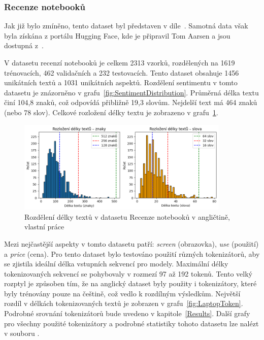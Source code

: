 \subsubsection{Recenze notebooků}
Jak již bylo zmíněno, tento dataset byl představen v díle~\cite{pontiki-etal-2014-semeval}. Samotná data však byla získána z portálu Hugging Face, kde je připravil Tom Aarsen a jsou dostupná z~\cite{TomLaptops}.

V datasetu recenzí notebooků je celkem 2313 vzorků, rozdělených na 1619 trénovacích, 462 validačních a 232 testovacích. Tento dataset obsahuje 1456 unikátních textů a 1031 unikátních aspektů. Rozdělení sentimentu v tomto datasetu je znázorněno v grafu~\ref{fig:SentimentDistribution}. Průměrná délka textu činí 104,8 znaků, což odpovídá přibližně 19,3 slovům. Nejdelší text má 464 znaků (nebo 78 slov). Celkové rozložení délky textu je zobrazeno v grafu~\ref{fig:LaptopLenDistribution}.

\begin{figure}[ht]
    \centering
    \includegraphics[width=0.9\textwidth]{images/Laptops-distribution}
    \caption[Rozdělení délky textů v datasetu Recenze notebooků v angličtině]%
    {Rozdělení délky textů v datasetu Recenze notebooků v angličtině, vlastní práce}
    \label{fig:LaptopLenDistribution}
\end{figure}

Mezi nejčastější aspekty v tomto datasetu patří: \emph{screen} (obrazovka), \emph{use} (použití) a \emph{price} (cena). Pro tento dataset bylo testováno použití různých tokenizátorů, aby se zjistila ideální délka vstupních sekvencí pro modely. Maximální délky tokenizovaných sekvencí se pohybovaly v rozmezí 97 až 192 tokenů. Tento velký rozptyl je způsoben tím, že na anglický dataset byly použity i tokenizátory, které byly trénovány pouze na češtině, což vedlo k rozdílným výsledkům. Největší rozdíl v délkách tokenizovaných textů je zobrazen v grafu~\ref{fig:LaptopToken}. Podrobné srovnání tokenizátorů bude uvedeno v kapitole~\ref{Results}. Další grafy pro všechny použité tokenizátory a podrobné statistiky tohoto datasetu lze nalézt v souboru .

